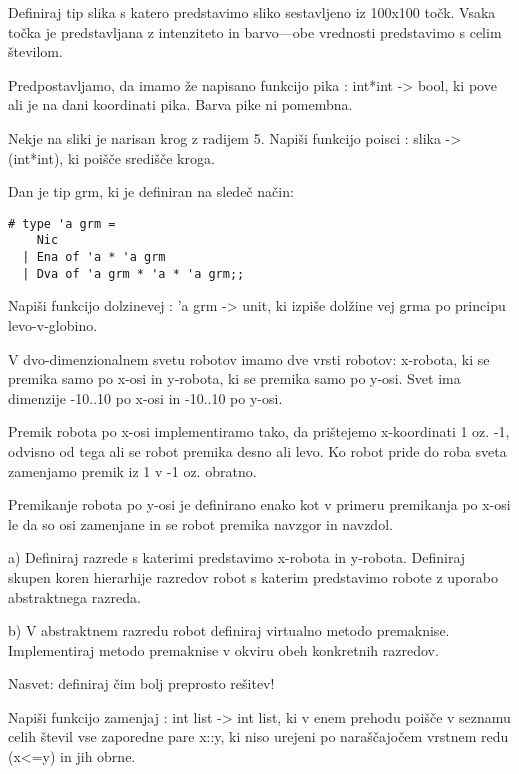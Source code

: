\begin{ex}
Definiraj tip slika s katero predstavimo sliko sestavljeno iz 100x100 to\v ck. Vsaka to\v cka je predstavljana z intenziteto in barvo---obe vrednosti predstavimo s celim \v stevilom. 

Predpostavljamo, da imamo \v ze napisano funkcijo pika : int*int -> bool, ki pove ali je na dani koordinati pika. Barva pike ni pomembna. 

Nekje na sliki je narisan krog z radijem 5. Napi\v si funkcijo poisci : slika -> (int*int), ki poi\v s\v ce sredi\v s\v ce kroga.


\end{ex} \begin{ex}
Dan je tip grm, ki je definiran na slede\v c na\v cin:

\begin{verbatim}
# type 'a grm = 
    Nic 
  | Ena of 'a * 'a grm 
  | Dva of 'a grm * 'a * 'a grm;;

\end{verbatim}
Napi\v si funkcijo dolzinevej : 'a grm -> unit, ki izpi\v se dol\v zine vej grma po principu levo-v-globino.


\end{ex} \begin{ex}
V dvo-dimenzionalnem svetu robotov imamo dve vrsti robotov: x-robota, ki se premika samo po x-osi in y-robota, ki se premika samo po y-osi. Svet ima dimenzije -10..10 po  x-osi in -10..10 po y-osi. 

Premik robota po x-osi implementiramo tako, da pri\v stejemo x-koordinati 1 oz. -1, odvisno od tega ali se robot premika desno ali levo. Ko robot pride do roba sveta zamenjamo premik iz 1 v -1 oz. obratno.

Premikanje robota po y-osi je definirano enako kot v primeru premikanja po x-osi le da so osi zamenjane in se robot premika navzgor in navzdol.

a) Definiraj razrede s katerimi predstavimo x-robota in y-robota. Definiraj skupen koren hierarhije razredov robot s katerim predstavimo robote z uporabo abstraktnega razreda. 

b) V abstraktnem razredu robot definiraj virtualno metodo premaknise. Implementiraj metodo premaknise v okviru obeh konkretnih razredov.


Nasvet: definiraj \v cim bolj preprosto re\v sitev!



\end{ex} \begin{ex}
Napi\v si funkcijo zamenjaj : int list -> int list, ki v enem prehodu poi\v s\v ce v seznamu celih \v stevil vse zaporedne pare x::y, ki niso urejeni po nara\v s\v cajo\v cem vrstnem redu (x<=y) in jih obrne. 


\end{ex}
